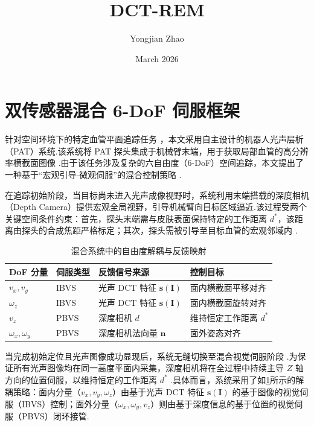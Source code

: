 \documentclass{article}
\title{DCT-REM}
\author{Yongjian Zhao}
\date{March 2026}
\begin{document}
\maketitle
\section{双传感器混合 6-DoF 伺服框架}
\label{sec:6dof_framework}
针对空间环境下的特定血管平面追踪任务 ，本文采用自主设计的机器人光声层析（PAT）系统.该系统将 PAT 探头集成于机械臂末端，用于获取局部血管的高分辨率横截面图像 .由于该任务涉及复杂的六自由度（6-DoF）空间追踪，本文提出了一种基于“宏观引导-微观伺服”的混合控制策略 .

在追踪初始阶段，当目标尚未进入光声成像视野时，系统利用末端搭载的深度相机（Depth Camera）提供宏观全局视野，引导机械臂向目标区域逼近.该过程受两个关键空间条件约束：首先，探头末端需与皮肤表面保持特定的工作距离 $d^*$，该距离由探头的合成焦距严格标定；其次，探头需被引导至目标血管的宏观邻域内 .

\begin{table}[htbp]
    \centering
    \caption{混合系统中的自由度解耦与反馈映射 }
    \label{tab:dof_decoupling}
    \begin{tabularx}{\columnwidth}{XXXX}
        \toprule
        \textbf{DoF 分量} & \textbf{伺服类型} & \textbf{反馈信号来源} & \textbf{控制目标} \\
        \midrule
        $v_x, v_y$ & IBVS & 光声 DCT 特征 $\mathbf{s}(\mathbf{I})$ & 面内横截面平移对齐 \\
        $\omega_z$ & IBVS & 光声 DCT 特征 $\mathbf{s}(\mathbf{I})$ & 面内横截面旋转对齐 \\
        $v_z$ & PBVS & 深度相机 $d$ & 维持恒定工作距离 $d^*$ \\
        $\omega_x, \omega_y$ & PBVS & 深度相机法向量 $\mathbf{n}$ & 面外姿态对齐 \\
        \bottomrule
    \end{tabularx}
\end{table}

当完成初始定位且光声图像成功显现后，系统无缝切换至混合视觉伺服阶段 .为保证所有光声图像均在同一高度平面内采集，深度相机将在全过程中持续主导 $Z$ 轴方向的位置伺服，以维持恒定的工作距离 $d^*$ .具体而言，系统采用了如\cref{tab:dof_decoupling}所示的解耦策略：面内分量（$v_x, v_y, \omega_z$）由基于光声 DCT 特征 $\mathbf{s}(\mathbf{I})$ 的基于图像的视觉伺服（IBVS）控制；面外分量（$\omega_x, \omega_y, v_z$）则由基于深度信息的基于位置的视觉伺服（PBVS）闭环接管.
\end{document}
